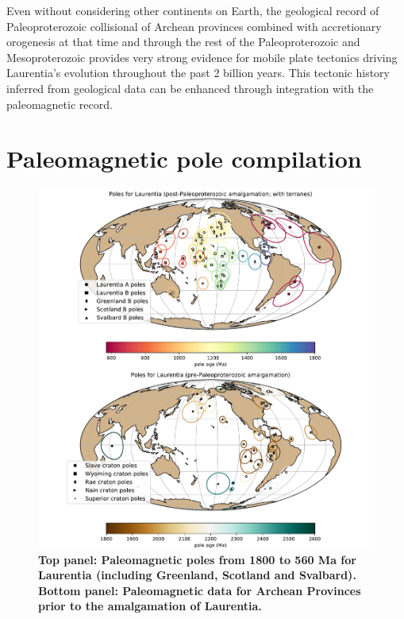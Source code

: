 \documentclass[11pt,letterpaper]{article}
\begin{document}
Even without considering other continents on Earth, the geological record of Paleoproterozoic collisional of Archean provinces combined with accretionary orogenesis at that time and through the rest of the Paleoproterozoic and Mesoproterozoic provides very strong evidence for mobile plate tectonics driving Laurentia's evolution throughout the past 2 billion years. This tectonic history inferred from geological data can be enhanced through integration with the paleomagnetic record.

\section*{Paleomagnetic pole compilation}

\begin{figure}
\centering
\includegraphics[width=\textwidth]{../Figures/Laurentia_poles_combined.pdf}
\caption{\small{\textbf{Top panel: Paleomagnetic poles from 1800 to 560 Ma for Laurentia (including Greenland, Scotland and Svalbard). Bottom panel: Paleomagnetic data for Archean Provinces prior to the amalgamation of Laurentia.}}}
\label{fig:Laurentia_poles}
\end{figure} 
\end{document}
